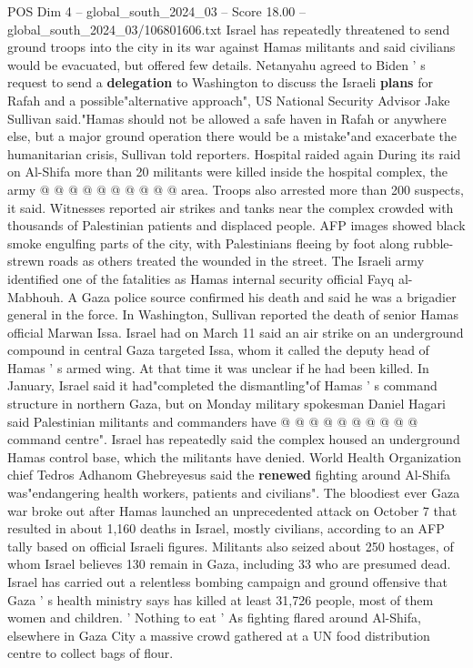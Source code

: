 \begin{textsample}{POS Dim 4 – global\_south\_2024\_03 – Score 18.00 – global\_south\_2024\_03/106801606.txt}
Israel has repeatedly threatened to send ground troops into the city in its war against Hamas militants and said civilians would be evacuated, but offered few details.
Netanyahu agreed to Biden ' s request to send a \textbf{delegation} to Washington to discuss the Israeli \textbf{plans} for Rafah and a possible"alternative approach", US National Security Advisor Jake Sullivan said."Hamas should not be allowed a safe haven in Rafah or anywhere else, but a major ground operation there would be a mistake"and exacerbate the humanitarian crisis, Sullivan told reporters.
Hospital raided again During its raid on Al-Shifa more than 20 militants were killed inside the hospital complex, the army @ @ @ @ @ @ @ @ @ @ area.
Troops also arrested more than 200 suspects, it said.
Witnesses reported air strikes and tanks near the complex crowded with thousands of Palestinian patients and displaced people.
AFP images showed black smoke engulfing parts of the city, with Palestinians fleeing by foot along rubble-strewn roads as others treated the wounded in the street.
The Israeli army identified one of the fatalities as Hamas internal security official Fayq al-Mabhouh.
A Gaza police source confirmed his death and said he was a brigadier general in the force.
In Washington, Sullivan reported the death of senior Hamas official Marwan Issa.
Israel had on March 11 said an air strike on an underground compound in central Gaza targeted Issa, whom it called the deputy head of Hamas ' s armed wing.
At that time it was unclear if he had been killed.
In January, Israel said it had"completed the dismantling"of Hamas ' s command structure in northern Gaza, but on Monday military spokesman Daniel Hagari said Palestinian militants and commanders have @ @ @ @ @ @ @ @ @ @ command centre".
Israel has repeatedly said the complex housed an underground Hamas control base, which the militants have denied.
World Health Organization chief Tedros Adhanom Ghebreyesus said the \textbf{renewed} fighting around Al-Shifa was"endangering health workers, patients and civilians".
The bloodiest ever Gaza war broke out after Hamas launched an unprecedented attack on October 7 that resulted in about 1,160 deaths in Israel, mostly civilians, according to an AFP tally based on official Israeli figures.
Militants also seized about 250 hostages, of whom Israel believes 130 remain in Gaza, including 33 who are presumed dead.
Israel has carried out a relentless bombing campaign and ground offensive that Gaza ' s health ministry says has killed at least 31,726 people, most of them women and children. ' Nothing to eat ' As fighting flared around Al-Shifa, elsewhere in Gaza City a massive crowd gathered at a UN food distribution centre to collect bags of flour.

\end{textsample}
